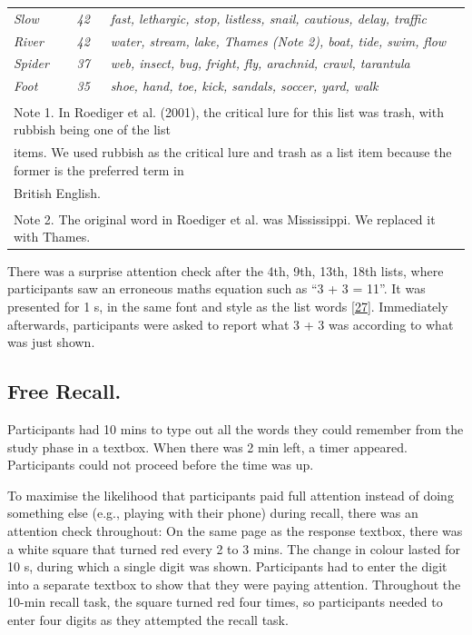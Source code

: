 \documentclass[
]{article}
\begin{document}
\begin{table}[H]
\begin{tabular}[t]{lll}
\em{Slow} & \em{42} & \em{fast, lethargic, stop, listless, snail, cautious, delay, traffic}\\
\em{River} & \em{42} & \em{water, stream, lake, Thames (Note 2), boat, tide, swim, flow}\\
\addlinespace
\em{Spider} & \em{37} & \em{web, insect, bug, fright, fly, arachnid, crawl, tarantula}\\
\em{Foot} & \em{35} & \em{shoe, hand, toe, kick, sandals, soccer, yard, walk}\\
\bottomrule
\multicolumn{3}{l}{\textsuperscript{} Note 1. In Roediger et al. (2001), the critical lure for this list was trash, with rubbish being one of the list}\\
\multicolumn{3}{l}{items. We used rubbish as the critical lure and trash as a list item because the former is the preferred term in}\\
\multicolumn{3}{l}{British English.}\\
\multicolumn{3}{l}{\textsuperscript{} Note 2. The original word in Roediger et al. was Mississippi. We replaced it with Thames.}\\
\end{tabular}
\end{table}

There was a surprise attention check after the 4th, 9th, 13th, 18th lists, where participants saw an erroneous maths equation such as ``3 + 3 = 11''. It was presented for 1 s, in the same font and style as the list words {[}\protect\hyperlink{ref-thomas2017a}{27}{]}. Immediately afterwards, participants were asked to report what 3 + 3 was according to what was just shown.

\hypertarget{free-recall.}{%
\subsection{Free Recall.}\label{free-recall.}}

Participants had 10 mins to type out all the words they could remember from the study phase in a textbox. When there was 2 min left, a timer appeared. Participants could not proceed before the time was up.

To maximise the likelihood that participants paid full attention instead of doing something else (e.g., playing with their phone) during recall, there was an attention check throughout: On the same page as the response textbox, there was a white square that turned red every 2 to 3 mins. The change in colour lasted for 10 s, during which a single digit was shown. Participants had to enter the digit into a separate textbox to show that they were paying attention. Throughout the 10-min recall task, the square turned red four times, so participants needed to enter four digits as they attempted the recall task.
\end{document}
